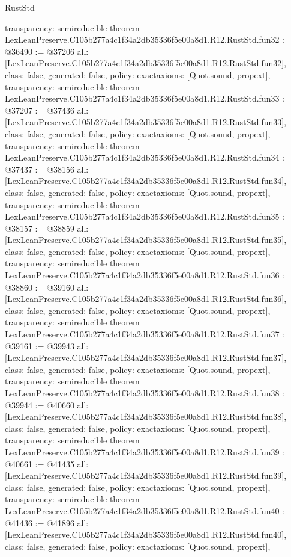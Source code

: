 \begin{lexlean}{RustStd}
\begin{coremodule}
{  transparency: semireducible
}
theorem LexLeanPreserve.C105b277a4c1f34a2db35336f5e00a8d1.R12.RustStd.fun32 : @36490 := @37206 {
  all: [LexLeanPreserve.C105b277a4c1f34a2db35336f5e00a8d1.R12.RustStd.fun32],
  class: false,
  generated: false,
  policy: exact{axioms: [Quot.sound, propext]},
  transparency: semireducible
}
theorem LexLeanPreserve.C105b277a4c1f34a2db35336f5e00a8d1.R12.RustStd.fun33 : @37207 := @37436 {
  all: [LexLeanPreserve.C105b277a4c1f34a2db35336f5e00a8d1.R12.RustStd.fun33],
  class: false,
  generated: false,
  policy: exact{axioms: [Quot.sound, propext]},
  transparency: semireducible
}
theorem LexLeanPreserve.C105b277a4c1f34a2db35336f5e00a8d1.R12.RustStd.fun34 : @37437 := @38156 {
  all: [LexLeanPreserve.C105b277a4c1f34a2db35336f5e00a8d1.R12.RustStd.fun34],
  class: false,
  generated: false,
  policy: exact{axioms: [Quot.sound, propext]},
  transparency: semireducible
}
theorem LexLeanPreserve.C105b277a4c1f34a2db35336f5e00a8d1.R12.RustStd.fun35 : @38157 := @38859 {
  all: [LexLeanPreserve.C105b277a4c1f34a2db35336f5e00a8d1.R12.RustStd.fun35],
  class: false,
  generated: false,
  policy: exact{axioms: [Quot.sound, propext]},
  transparency: semireducible
}
theorem LexLeanPreserve.C105b277a4c1f34a2db35336f5e00a8d1.R12.RustStd.fun36 : @38860 := @39160 {
  all: [LexLeanPreserve.C105b277a4c1f34a2db35336f5e00a8d1.R12.RustStd.fun36],
  class: false,
  generated: false,
  policy: exact{axioms: [Quot.sound, propext]},
  transparency: semireducible
}
theorem LexLeanPreserve.C105b277a4c1f34a2db35336f5e00a8d1.R12.RustStd.fun37 : @39161 := @39943 {
  all: [LexLeanPreserve.C105b277a4c1f34a2db35336f5e00a8d1.R12.RustStd.fun37],
  class: false,
  generated: false,
  policy: exact{axioms: [Quot.sound, propext]},
  transparency: semireducible
}
theorem LexLeanPreserve.C105b277a4c1f34a2db35336f5e00a8d1.R12.RustStd.fun38 : @39944 := @40660 {
  all: [LexLeanPreserve.C105b277a4c1f34a2db35336f5e00a8d1.R12.RustStd.fun38],
  class: false,
  generated: false,
  policy: exact{axioms: [Quot.sound, propext]},
  transparency: semireducible
}
theorem LexLeanPreserve.C105b277a4c1f34a2db35336f5e00a8d1.R12.RustStd.fun39 : @40661 := @41435 {
  all: [LexLeanPreserve.C105b277a4c1f34a2db35336f5e00a8d1.R12.RustStd.fun39],
  class: false,
  generated: false,
  policy: exact{axioms: [Quot.sound, propext]},
  transparency: semireducible
}
theorem LexLeanPreserve.C105b277a4c1f34a2db35336f5e00a8d1.R12.RustStd.fun40 : @41436 := @41896 {
  all: [LexLeanPreserve.C105b277a4c1f34a2db35336f5e00a8d1.R12.RustStd.fun40],
  class: false,
  generated: false,
  policy: exact{axioms: [Quot.sound, propext]},
}
\end{coremodule}
\end{lexlean}
